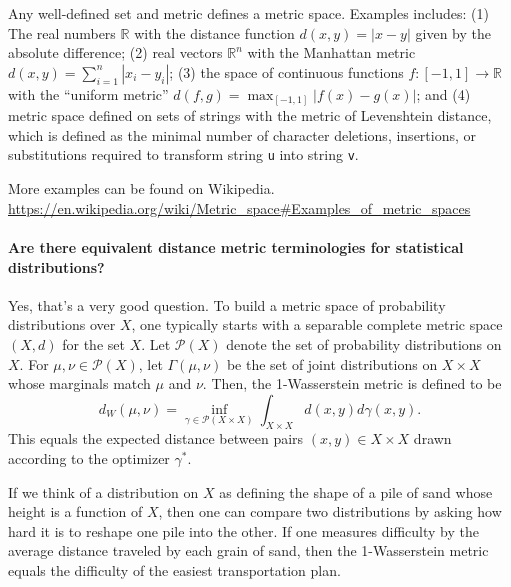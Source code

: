 \documentclass[10pt,english]{article}
\begin{document}
Any well-defined set and metric defines a metric space. Examples includes: (1) The real numbers $\mathbb{R}$ with the distance function $d(x,y) = \vert x-y\vert$ given by the absolute difference; (2) real vectors $\mathbb{R}^n$ with the Manhattan metric $d(x,y) = \sum_{i=1}^n |x_i - y_i|$; (3) the space of continuous functions $f\colon [-1,1] \to \mathbb{R}$ with the ``uniform metric'' $d(f,g) = \max_{[-1,1]} | f(x)-g(x)|$;
%
% 
and (4) metric space defined on sets of strings with the metric of Levenshtein distance, which is defined as the minimal number of character deletions, insertions, or substitutions required to transform string \texttt{u} into string \texttt{v}.
  
More examples can be found on Wikipedia. \url{https://en.wikipedia.org/wiki/Metric_space#Examples_of_metric_spaces}

\paragraph{Are there equivalent distance metric terminologies for statistical distributions?}

Yes, that's a very good question.
To build a metric space of probability distributions over $X$, one typically starts with a separable complete metric space $(X,d)$ for the set $X$.
Let $\mathcal{P}(X)$ denote the set of probability distributions on $X$.
For $\mu,\nu \in \mathcal{P}(X)$, let $\Gamma(\mu,\nu)$ be the set of joint distributions on $X \times X$ whose marginals match $\mu$ and $\nu$.
Then, the 1-Wasserstein metric is defined to be
\[ d_W (\mu, \nu) = \inf_{\gamma \in \mathcal{P}(X\times X)} \int_{X\times X} d(x,y) d\gamma(x,y).  \]
This equals the expected distance between pairs $(x,y) \in X \times X$ drawn according to the optimizer $\gamma^*$.

If we think of a distribution on $X$ as defining the shape of a pile of sand whose height is a function of $X$, then one can compare two distributions by asking how hard it is to reshape one pile into the other.
If one measures difficulty by the average distance traveled by each grain of sand, then the 1-Wasserstein metric equals the difficulty of the easiest transportation plan.
\end{document}
